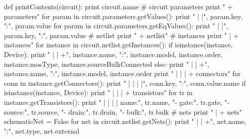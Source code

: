 \begin{DoxyCodeInclude}
\textcolor{keyword}{def }printContents(circuit):
  \textcolor{keywordflow}{print} circuit.name
  \textcolor{comment}{# circuit parameters}
  \textcolor{keywordflow}{print} \textcolor{stringliteral}{" + parameters"}
  \textcolor{keywordflow}{for} param \textcolor{keywordflow}{in} circuit.parameters.getValues():
    \textcolor{keywordflow}{print} \textcolor{stringliteral}{" | |"}, param.key, \textcolor{stringliteral}{":"}, param.value
  \textcolor{keywordflow}{for} param \textcolor{keywordflow}{in} circuit.parameters.getEqValues():
    \textcolor{keywordflow}{print} \textcolor{stringliteral}{" | |"}, param.key, \textcolor{stringliteral}{":"}, param.value
  \textcolor{comment}{# netlist}
  \textcolor{keywordflow}{print} \textcolor{stringliteral}{" + netlist"}
  \textcolor{comment}{#  instances}
  \textcolor{keywordflow}{print} \textcolor{stringliteral}{" | + instances"}
  \textcolor{keywordflow}{for} instance \textcolor{keywordflow}{in} circuit.netlist.getInstances():
    \textcolor{keywordflow}{if} isinstance(instance, Device): 
      \textcolor{keywordflow}{print} \textcolor{stringliteral}{" | | +"}, instance.name, \textcolor{stringliteral}{":"}, instance.model, instance.order, instance.mosType, 
      instance.sourceBulkConnected
    \textcolor{keywordflow}{else}:
      \textcolor{keywordflow}{print} \textcolor{stringliteral}{" | | +"}, instance.name, \textcolor{stringliteral}{":"}, instance.model, instance.order
    \textcolor{keywordflow}{print} \textcolor{stringliteral}{" | | | + connectors"}
    \textcolor{keywordflow}{for} conn \textcolor{keywordflow}{in} instance.getConnectors():
      \textcolor{keywordflow}{print} \textcolor{stringliteral}{" | | | |"}, conn.key, \textcolor{stringliteral}{":"}, conn.value.name
    \textcolor{keywordflow}{if} isinstance(instance, Device): 
      \textcolor{keywordflow}{print} \textcolor{stringliteral}{" | | | + transistors"}
      \textcolor{keywordflow}{for} tr \textcolor{keywordflow}{in} instance.getTransistors():
        \textcolor{keywordflow}{print} \textcolor{stringliteral}{" | | | | name:"}, tr.name, \textcolor{stringliteral}{"- gate:"}, tr.gate, \textcolor{stringliteral}{"- source:"}, tr.source, \textcolor{stringliteral}{"- drain:"}, tr.drain, \textcolor{stringliteral}{
      "- bulk:"}, tr.bulk
  \textcolor{comment}{#  nets}
  \textcolor{keywordflow}{print} \textcolor{stringliteral}{" | + nets"}
  schematicNet = \textcolor{keyword}{False}
  \textcolor{keywordflow}{for} net \textcolor{keywordflow}{in} circuit.netlist.getNets():
    \textcolor{keywordflow}{print} \textcolor{stringliteral}{" | | +"}, net.name, \textcolor{stringliteral}{":"}, net.type, net.external

\end{DoxyCodeInclude}
